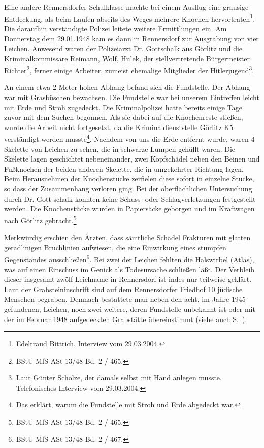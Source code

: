 \documentclass[a4paper,12pt,ngerman,
]{nisebook}
\begin{document}
Eine andere Rennersdorfer Schulklasse machte bei einem Ausflug eine grausige Entdeckung, als beim Laufen abseits des Weges mehrere Knochen hervortraten\footnote{Edeltraud Bittrich. Interview vom 29.03.2004.}. Die daraufhin verständigte Polizei leitete weitere Ermittlungen ein.
Am Donnerstag dem 29.01.1948 kam es dann in Rennersdorf zur Ausgrabung von vier Leichen. Anwesend waren der Polizeiarzt Dr. Gottschalk aus Görlitz und die Kriminalkommissare Reimann, Wolf, Hulek, der stellvertretende Bürgermeister Richter\footnote{BStU MfS ASt 13/48 Bd. 2 / 465.}, ferner einige Arbeiter, zumeist ehemalige Mitglieder der Hitlerjugend\footnote{Laut Günter Scholze, der damals selbst mit Hand anlegen musste. Telefonisches Interview vom 29.03.2004.}.
\begin{leftbar} 
An einem etwa 2 Meter hohen Abhang befand sich die Fundstelle. Der Abhang war mit Grasbüschen bewachsen. Die Fundstelle war bei unserem Eintreffen leicht mit Erde und Stroh zugedeckt. Die Kriminalpolizei hatte bereits einige Tage zuvor mit dem Suchen begonnen. Als sie dabei auf die Knochenreste stießen, wurde die Arbeit nicht fortgesetzt, da die Kriminaldienststelle Görlitz K5 verständigt werden musste\footnote{Das erklärt, warum die Fundstelle mit Stroh und Erde abgedeckt war.}.
\newline
Nachdem von uns die Erde entfernt wurde, waren 4 Skelette von Leichen zu sehen, die in schwarze Lumpen gehüllt waren. Die Skelette lagen geschichtet nebeneinander, zwei Kopfschädel neben den Beinen und Fußknochen der beiden anderen Skelette, die in umgekehrter Richtung lagen. Beim Herausnehmen der Knochenstücke zerfielen diese sofort in einzelne Stücke, so dass der Zusammenhang verloren ging. Bei der oberflächlichen Untersuchung durch Dr. Gott-schalk konnten keine Schuss- oder Schlagverletzungen festgestellt werden. Die Knochenstücke wurden in Papiersäcke geborgen und im Kraftwagen nach Görlitz gebracht.\footnote{BStU MfS ASt 13/48 Bd. 2 / 465.}
\end{leftbar}
Merkwürdig erschien den Ärzten, dass sämtliche Schädel Frakturen mit glatten geradlinigen Bruchlinien aufwiesen, die eine Einwirkung eines stumpfen Gegenstandes ausschließen\footnote{BStU MfS ASt 13/48 Bd. 2 / 467.}.
Bei zwei der Leichen fehlten die Halswirbel (Atlas), was auf einen Einschuss im Genick als Todesursache schließen läßt. 
\newline
Der Verbleib dieser insgesamt zwölf Leichname in Rennersdorf ist indes nur teilweise geklärt. Laut der Grabsteininschrift sind auf dem Rennersdorfer Friedhof 10 jüdische Menschen begraben. Demnach bestattete man neben den acht, im Jahre 1945 gefundenen, Leichen, noch zwei weitere, deren Fundstelle unbekannt ist oder mit der im Februar 1948 aufgedeckten Grabstätte übereinstimmt (siehe auch S.~\pageref{leichen}).
\end{document}
